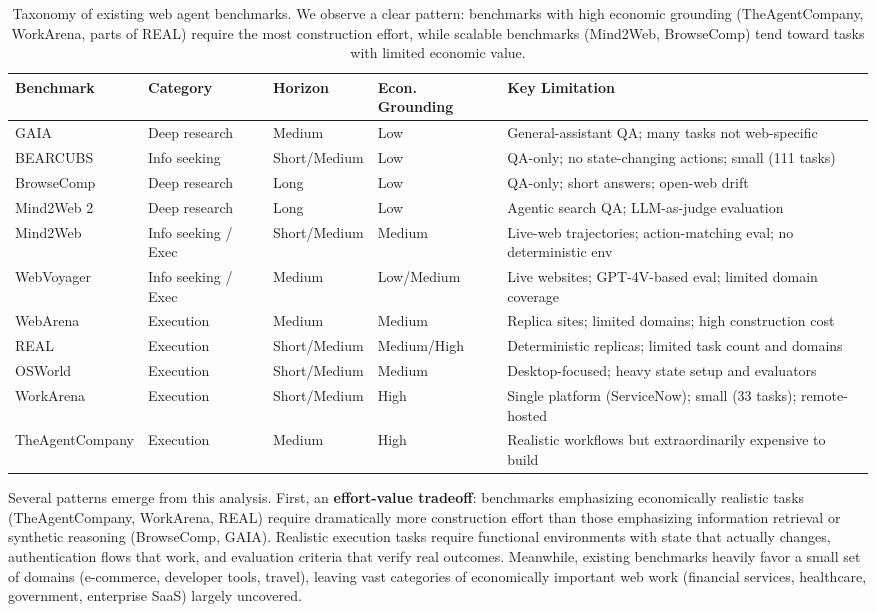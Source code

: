 \documentclass[letterpaper]{article}
\begin{document}
\begin{table}[t]
\caption{Taxonomy of existing web agent benchmarks. We observe a clear pattern: benchmarks with high economic grounding (TheAgentCompany, WorkArena, parts of REAL) require the most construction effort, while scalable benchmarks (Mind2Web, BrowseComp) tend toward tasks with limited economic value.}
\label{tab:taxonomy}
\vskip 0.1in
\centering
\small
\begin{tabular}{@{}llllp{5.5cm}@{}}
\toprule
\textbf{Benchmark} & \textbf{Category} & \textbf{Horizon} & \textbf{Econ. Grounding} & \textbf{Key Limitation} \\
\midrule
GAIA & Deep research & Medium & Low & General-assistant QA; many tasks not web-specific \\
BEARCUBS & Info seeking & Short/Medium & Low & QA-only; no state-changing actions; small (111 tasks) \\
BrowseComp & Deep research & Long & Low & QA-only; short answers; open-web drift \\
Mind2Web 2 & Deep research & Long & Low & Agentic search QA; LLM-as-judge evaluation \\
Mind2Web & Info seeking / Exec & Short/Medium & Medium & Live-web trajectories; action-matching eval; no deterministic env \\
WebVoyager & Info seeking / Exec & Medium & Low/Medium & Live websites; GPT-4V-based eval; limited domain coverage \\
WebArena & Execution & Medium & Medium & Replica sites; limited domains; high construction cost \\
REAL & Execution & Short/Medium & Medium/High & Deterministic replicas; limited task count and domains \\
OSWorld & Execution & Short/Medium & Medium & Desktop-focused; heavy state setup and evaluators \\
WorkArena & Execution & Short/Medium & High & Single platform (ServiceNow); small (33 tasks); remote-hosted \\
TheAgentCompany & Execution & Medium & High & Realistic workflows but extraordinarily expensive to build \\
\bottomrule
\end{tabular}
\end{table}

Several patterns emerge from this analysis. First, an \textbf{effort-value tradeoff}: benchmarks emphasizing economically realistic tasks (TheAgentCompany, WorkArena, REAL) require dramatically more construction effort than those emphasizing information retrieval or synthetic reasoning (BrowseComp, GAIA). Realistic execution tasks require functional environments with state that actually changes, authentication flows that work, and evaluation criteria that verify real outcomes. Meanwhile, existing benchmarks heavily favor a small set of domains (e-commerce, developer tools, travel), leaving vast categories of economically important web work (financial services, healthcare, government, enterprise SaaS) largely uncovered.
\end{document}
